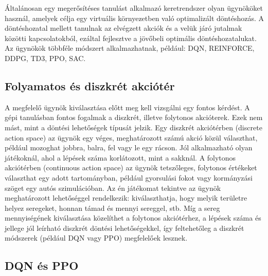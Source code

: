 \documentclass[
]{thesis-ekf}
\theoremstyle{definition}
\theoremstyle{remark}
\begin{document}
Általánosan egy megerősítéses tanulást alkalmazó keretrendszer olyan ügynököket használ, amelyek célja egy virtuális környezetben való optimalizált döntéshozás. A döntéshozatal mellett tanulnak az elvégzett akciók és a velük járó jutalmak közötti kapcsolatokból, ezáltal fejlesztve a jövőbeli optimális döntéshozatalukat. Az ügynökök többféle módszert alkalmazhatnak, például: DQN, REINFORCE, DDPG, TD3, PPO, SAC.

\subsection{Folyamatos és diszkrét akciótér}

A megfelelő ügynök kiválasztása előtt meg kell vizsgálni egy fontos kérdést. A gépi tanulásban fontos fogalmak a diszkrét, illetve folytonos akcióterek. \cite{ActSpac} Ezek nem mást, mint a döntési lehetőségek típusát jelzik. Egy diszkrét akciótérben (discrete action space) az ügynök egy véges, meghatározott számú akció közül választhat, például mozoghat jobbra, balra, fel vagy le egy rácson. Jól alkalmazható olyan játékoknál, ahol a lépések száma korlátozott, mint a sakknál. A folytonos akciótérben (continuous action space) az ügynök tetszőleges, folytonos értékeket választhat egy adott tartományban, például gyorsulási fokot vagy kormányzási szöget egy autós szimulációban. Az én játékomat tekintve az ügynök meghatározott lehetőséggel rendelkezik: kiválaszthatja, hogy melyik területre helyez seregeket, honnan támad és mennyi sereggel, stb. Míg a sereg mennyiségének kiválasztása közelíthet a folytonos akciótérhez, a lépések száma és jellege jól leírható diszkrét döntési lehetőségekkel, így feltehetőleg a diszkrét módszerek (például DQN vagy PPO) megfelelőek lesznek.

\subsection{DQN és PPO}
\end{document}
